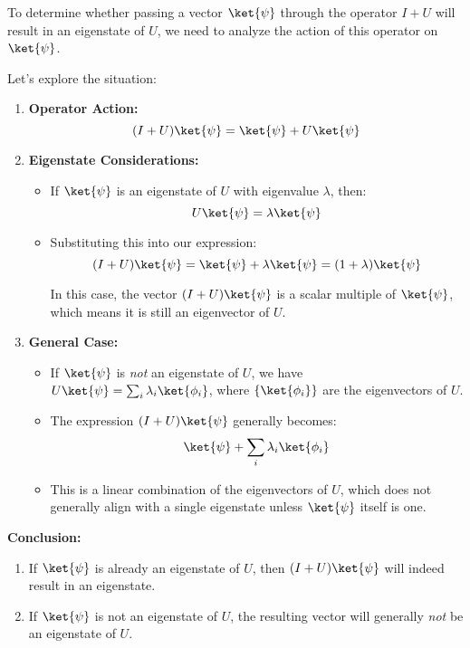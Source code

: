 \begin{airesult}
To determine whether passing a vector \(\ket{\psi}\) through the operator \(I + U\) will result in
an eigenstate of \(U\), we need to analyze the action of this operator on \(\ket{\psi}\).

Let's explore the situation:

\begin{enumerate}
\item \textbf{Operator Action:}
  \[
  (I + U)\ket{\psi} = \ket{\psi} + U\ket{\psi}
  \]

\item \textbf{Eigenstate Considerations:}
  \begin{itemize}
  \item If \(\ket{\psi}\) is an eigenstate of \(U\) with eigenvalue \(\lambda\), then:
    \[
    U\ket{\psi} = \lambda \ket{\psi}
    \]

  \item Substituting this into our expression:
    \[
    (I + U)\ket{\psi} = \ket{\psi} + \lambda \ket{\psi} = (1 + \lambda)\ket{\psi}
    \]

  In this case, the vector \((I + U)\ket{\psi}\) is a scalar multiple of \(\ket{\psi}\), which means
it is still an eigenvector of \(U\).
  \end{itemize}

\item \textbf{General Case:}
  \begin{itemize}
  \item If \(\ket{\psi}\) is \textit{not} an eigenstate of \(U\), we have \(U\ket{\psi} = \sum_i
\lambda_i \ket{\phi_i}\), where \(\{\ket{\phi_i}\}\) are the eigenvectors of \(U\).

  \item The expression \((I + U)\ket{\psi}\) generally becomes:
    \[
    \ket{\psi} + \sum_i \lambda_i \ket{\phi_i}
    \]

  \item This is a linear combination of the eigenvectors of \(U\), which does not generally align
with a single eigenstate unless \(\ket{\psi}\) itself is one.
  \end{itemize}

\end{enumerate}

\vsp
\textbf{Conclusion:}

\begin{enumerate}
\item If \(\ket{\psi}\) is already an eigenstate of \(U\), then \((I + U)\ket{\psi}\) will indeed
result in an eigenstate.
\item If \(\ket{\psi}\) is not an eigenstate of \(U\), the resulting vector will generally
\textit{not} be an eigenstate of \(U\).
\end{enumerate}


\end{airesult}
